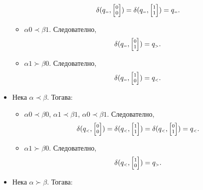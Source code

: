 \begin{hint}
\begin{itemize}
\begin{itemize}
      \[\delta(q_{\scriptscriptstyle{=}},\scriptsize{\begin{bmatrix} 0\\0\end{bmatrix}}) = \delta(q_{\scriptscriptstyle{=}},\scriptsize{\begin{bmatrix} 1\\1\end{bmatrix}}) = q_{\scriptscriptstyle{=}}.\]
    \item
      $\alpha 0 \prec \beta 1$. Следователно,
      \[\delta(q_{\scriptscriptstyle{=}},\scriptsize{\begin{bmatrix} 0\\1\end{bmatrix}}) = q_{\scriptscriptstyle{>}}.\]
    \item
      $\alpha 1 \succ \beta 0$. Следователно,
      \[\delta(q_{\scriptscriptstyle{=}},\scriptsize{\begin{bmatrix} 1\\0\end{bmatrix}}) = q_{\scriptscriptstyle{<}}.\]
    \end{itemize}
  \item 
    Нека $\alpha \prec \beta$. Тогава:
    \begin{itemize}
    \item 
      $\alpha 0 \prec \beta 0$, $\alpha 1 \prec \beta 1$, $\alpha 0 \prec \beta 1$. Следователно,
      \[\delta(q_{\scriptscriptstyle{<}},\scriptsize{\begin{bmatrix} 0\\0\end{bmatrix}}) = \delta(q_{\scriptscriptstyle{<}},\scriptsize{\begin{bmatrix} 1\\1\end{bmatrix}}) = \delta(q_{\scriptscriptstyle{<}},\scriptsize{\begin{bmatrix} 0\\1\end{bmatrix}}) = q_{\scriptscriptstyle{<}}.\]
    \item
      $\alpha 1 \succ \beta 0$. Следователно,
      \[\delta(q_{\scriptscriptstyle{<}},\scriptsize{\begin{bmatrix} 1\\0\end{bmatrix}}) = q_{\scriptscriptstyle{>}}.\]
    \end{itemize}
  \item
    Нека $\alpha \succ \beta$. Тогава:
    \begin{itemize}

\end{itemize}
\end{itemize}
\end{hint}
